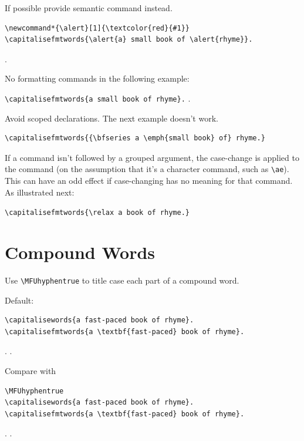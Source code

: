 \documentclass{article}
\begin{document}
\medskip

If possible provide semantic command instead.

\begin{verbatim}
\newcommand*{\alert}[1]{\textcolor{red}{#1}}
\capitalisefmtwords{\alert{a} small book of \alert{rhyme}}.
\end{verbatim}
\newcommand*{\alert}[1]{\textcolor{red}{#1}}
\capitalisefmtwords{\alert{a} small book of \alert{rhyme}}.

\medskip

No formatting commands in the following example:

\verb|\capitalisefmtwords{a small book of rhyme}.|
.

\medskip

Avoid scoped declarations. The next example doesn't work.

\begin{verbatim}
\capitalisefmtwords{{\bfseries a \emph{small book} of} rhyme.}
\end{verbatim}

\medskip

If a command isn't followed by a grouped argument, the
case-change is applied to the command (on the assumption
that it's a character command, such as \verb|\ae|). This can
have an odd effect if case-changing has no meaning for that command.
As illustrated next:

\verb|\capitalisefmtwords{\relax a book of rhyme.}|

\section{Compound Words}

Use \verb|\MFUhyphentrue| to title case each part of
a compound word.

Default:
\begin{verbatim}
\capitalisewords{a fast-paced book of rhyme}.
\capitalisefmtwords{a \textbf{fast-paced} book of rhyme}.
\end{verbatim}
.
.

Compare with
\begin{verbatim}
\MFUhyphentrue
\capitalisewords{a fast-paced book of rhyme}.
\capitalisefmtwords{a \textbf{fast-paced} book of rhyme}.
\end{verbatim}
\MFUhyphentrue
{}.
.
\end{document}
